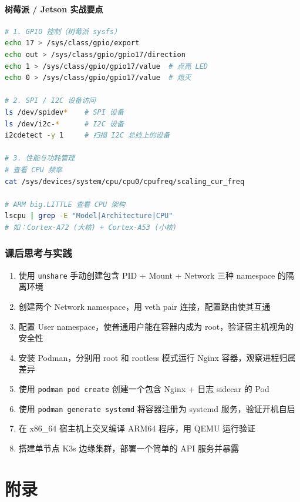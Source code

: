 \documentclass[12pt,UTF8]{ctexbook}
\begin{document}
\subsection{树莓派 / Jetson 实战要点}

\begin{lstlisting}[language=bash]
# 1. GPIO 控制（树莓派 sysfs）
echo 17 > /sys/class/gpio/export
echo out > /sys/class/gpio/gpio17/direction
echo 1 > /sys/class/gpio/gpio17/value  # 点亮 LED
echo 0 > /sys/class/gpio/gpio17/value  # 熄灭

# 2. SPI / I2C 设备访问
ls /dev/spidev*    # SPI 设备
ls /dev/i2c-*      # I2C 设备
i2cdetect -y 1     # 扫描 I2C 总线上的设备

# 3. 性能与功耗管理
# 查看 CPU 频率
cat /sys/devices/system/cpu/cpu0/cpufreq/scaling_cur_freq

# ARM big.LITTLE 查看 CPU 架构
lscpu | grep -E "Model|Architecture|CPU"
# 如：Cortex-A72 (大核) + Cortex-A53 (小核)
\end{lstlisting}

\section{课后思考与实践}
\label{sec:container-advanced-practice}
\begin{enumerate}
    \item 使用 \texttt{unshare} 手动创建包含 PID + Mount + Network 三种 namespace 的隔离环境
    \item 创建两个 Network namespace，用 veth pair 连接，配置路由使其互通
    \item 配置 User namespace，使普通用户能在容器内成为 root，验证宿主机视角的安全性
    \item 安装 Podman，分别用 root 和 rootless 模式运行 Nginx 容器，观察进程归属差异
    \item 使用 \texttt{podman pod create} 创建一个包含 Nginx + 日志 sidecar 的 Pod
    \item 使用 \texttt{podman generate systemd} 将容器注册为 systemd 服务，验证开机自启
    \item 在 x86\_64 宿主机上交叉编译 ARM64 程序，用 QEMU 运行验证
    \item 搭建单节点 K3s 边缘集群，部署一个简单的 API 服务并暴露
\end{enumerate}

\part{附录}
\end{document}
